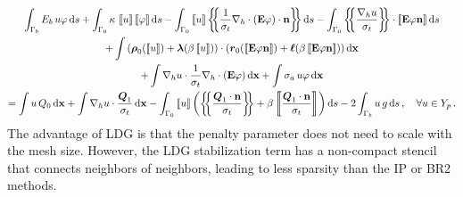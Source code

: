 \documentclass[../doc.tex]{subfiles}
\begin{document}
	\begin{multline} \label{dgvef:ldg}
		\int_{\Gamma_b} E_b\, u \varphi \ud s + \int_{\Gamma_0} \kappa\, \jump{u}\jump{\varphi} \ud s - \int_{\Gamma_0} \jump{u} \avg{\frac{1}{\sigma_t}\nablah\cdot\paren{\E\varphi}\cdot\n} \ud s - \int_{\Gamma_0} \avg{\frac{\nablah u}{\sigma_t}} \cdot \jump{\E\varphi\n} \ud s \\
		+ \int \paren{\vec{\rho}_0\!\paren{\jump{u}} + \vec{\lambda}\!\paren{\beta\jump{u}}}\cdot\paren{\vec{r}_0\!\paren{\jump{\E\varphi\n}} + \vec{\ell}\!\paren{\beta\jump{\E\varphi\n}}} \ud \x \\+ \int \nablah u \cdot \frac{1}{\sigma_t}\nablah\cdot\paren{\E\varphi} \ud \x + \int \sigma_a\, u \varphi \ud \x 
		\\= \int u\, Q_0 \ud \x + \int \nablah u \cdot \frac{\vec{Q}_1}{\sigma_t} \ud \x - \int_{\Gamma_0} \jump{u} \paren{\avg{\frac{\vec{Q}_1\cdot\n}{\sigma_t}} + \beta\jump{\frac{\vec{Q}_1\cdot\n}{\sigma_t}}} \ud s - 2\int_{\Gamma_b} u\, g \ud s \,, \quad \forall u \in Y_p \,. 
	\end{multline}
The advantage of LDG is that the penalty parameter does not need to scale with the mesh size. However, the LDG stabilization term has a non-compact stencil that connects neighbors of neighbors, leading to less sparsity than the IP or BR2 methods. 
\end{document}
